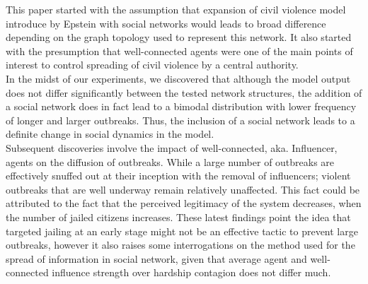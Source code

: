 \documentclass[10pt]{article}
\begin{document}
    This paper started with the assumption that expansion of civil violence model introduce by Epstein with social networks would leads to broad difference depending on the graph topology used to represent this network. It also started with the presumption that well-connected agents were one of the main points of interest to control spreading of civil violence by a central authority.\\
    In the midst of our experiments, we discovered that although the model output does not differ significantly between the tested network structures, the addition of a social network does in fact lead to a bimodal distribution with lower frequency of longer and larger outbreaks. Thus, the inclusion of a social network leads to a definite change in social dynamics in the model.\\
    Subsequent discoveries involve the impact of well-connected, aka. Influencer, agents on the diffusion of outbreaks. While a large number of outbreaks are effectively snuffed out at their inception with the removal of influencers; violent outbreaks that are well underway remain relatively unaffected. This fact could be attributed to the fact that the perceived legitimacy of the system decreases, when the number of jailed citizens increases. These latest findings point the idea that targeted jailing at an early stage might not be an effective tactic to prevent large outbreaks, however it also raises some interrogations on the method used for the spread of information in social network, given that average agent and well-connected influence strength over hardship contagion does not differ much.



\end{document}
